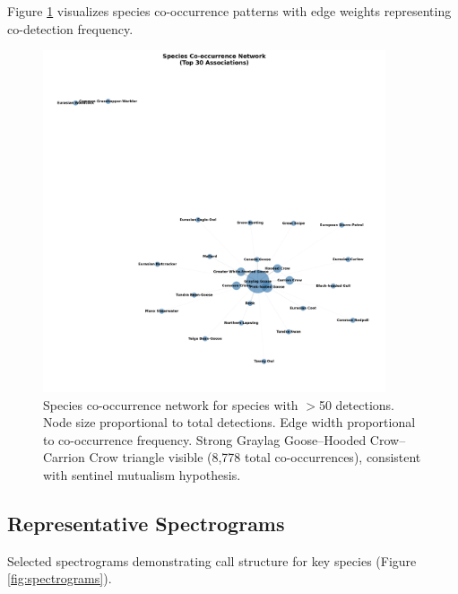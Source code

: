 \documentclass[twocolumn]{article}
\begin{document}
Figure \ref{fig:cooccurrence} visualizes species co-occurrence patterns with edge weights representing co-detection frequency.

\begin{figure}[H]
\centering
\includegraphics[width=0.9\textwidth]{figures/cooccurrence_network.png}
\caption{Species co-occurrence network for species with $>$50 detections. Node size proportional to total detections. Edge width proportional to co-occurrence frequency. Strong Graylag Goose--Hooded Crow--Carrion Crow triangle visible (8,778 total co-occurrences), consistent with sentinel mutualism hypothesis.}
\label{fig:cooccurrence}
\end{figure}

\subsection{Representative Spectrograms}

Selected spectrograms demonstrating call structure for key species (Figure \ref{fig:spectrograms}).
\end{document}
